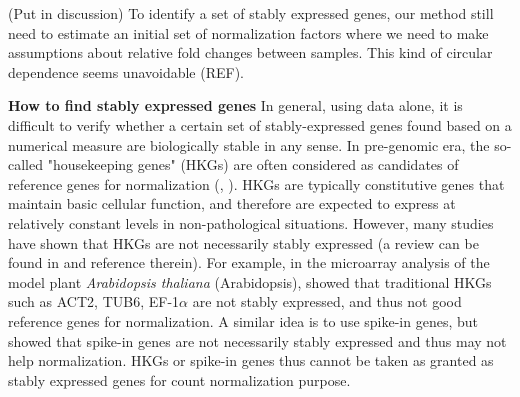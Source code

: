 \documentclass[11pt, a4paper]{article}
\begin{document}


(Put in discussion) To identify a set of stably expressed genes, our method
still need to estimate an initial set of normalization factors where we need
to make assumptions about relative fold changes between samples. This kind of
circular dependence seems unavoidable (REF). 



\textbf{How to find stably expressed genes}
In general, using data alone, it is difficult to verify
whether a certain set of stably-expressed genes found based on a numerical
measure are biologically stable in any sense.
In pre-genomic era, the so-called "housekeeping genes" (HKGs) are
often considered as candidates of reference genes for normalization (\cite{bustin2002quantification}, \cite{andersen2004normalization}). HKGs are
typically constitutive genes that maintain basic cellular function, and
therefore are expected to express at relatively constant levels in
non-pathological situations.  However, many studies have shown that HKGs are
not necessarily stably expressed (a review can be found in
\cite{huggett2005real} and reference therein).  For example, in the microarray
analysis of the model plant \textit{Arabidopsis thaliana} (Arabidopsis),
\cite{czechowski2005genome} showed that traditional HKGs such as ACT2, TUB6,
EF-1$\alpha$ are not stably expressed, and thus not good reference genes for
normalization.  A similar idea is to use spike-in genes, but
\cite{risso2014nat} showed that spike-in genes are not necessarily stably
expressed and thus may not help normalization.  HKGs or spike-in genes thus
cannot be taken as granted as stably expressed genes for count normalization
purpose.
 
\end{document}
